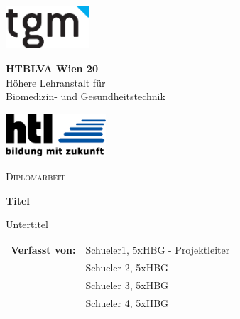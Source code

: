 
\begin{titlepage}

    \noindent
    \begin{minipage}[t]{0.3\textwidth}
    \includegraphics[height=1.6cm]{bilder/schullogo.png}
    \end{minipage}
    \begin{minipage}[t]{0.4\textwidth}
    \centering
    \vspace{-1.5cm} %
    \textbf{HTBLVA Wien 20}\\
    Höhere Lehranstalt für\\
    Biomedizin- und Gesundheitstechnik
    \end{minipage}
    \begin{minipage}[t]{0.3\textwidth}
    \raggedleft
    \includegraphics[height=1.6cm]{bilder/HTL_Logo.png}
    \end{minipage}


    \vspace{2cm}

    \begin{center}
        {\large\textsc{Diplomarbeit}\par}
        \vspace{1.5cm}
        
        {\LARGE\textbf{Titel}\par}
        \vspace{1cm}
        {\large Untertitel \par}
        \vspace{2.5cm}
        
        \begin{tabular}{ll}
            \textbf{Verfasst von:} & Schueler1, 5xHBG - Projektleiter \\
            & Schueler 2, 5xHBG \\
            & Schueler 3, 5xHBG \\
            & Schueler 4, 5xHBG \\
        \end{tabular}
        \vspace{1cm}
        

\end{center}
\end{titlepage}
